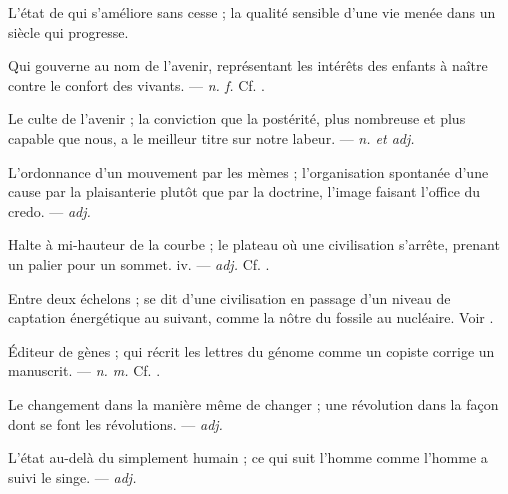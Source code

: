  L'état de qui s'améliore sans cesse ; la qualité sensible d'une vie menée dans un siècle qui progresse.

 Qui gouverne au nom de l'avenir, représentant les intérêts des enfants à naître contre le confort des vivants. ---  \textit{n. f.} Cf. .

 Le culte de l'avenir ; la conviction que la postérité, plus nombreuse et plus capable que nous, a le meilleur titre sur notre labeur. ---  \textit{n. et adj.}

 L'ordonnance d'un mouvement par les mèmes ; l'organisation spontanée d'une cause par la plaisanterie plutôt que par la doctrine, l'image faisant l'office du credo. ---  \textit{adj.}

 Halte à mi-hauteur de la courbe ; le plateau où une civilisation s'arrête, prenant un palier pour un sommet.   iv. ---  \textit{adj.} Cf. .

 Entre deux échelons ; se dit d'une civilisation en passage d'un niveau de captation énergétique au suivant, comme la nôtre du fossile au nucléaire. Voir .

 Éditeur de gènes ; qui récrit les lettres du génome comme un copiste corrige un manuscrit. ---  \textit{n. m.} Cf. .

 Le changement dans la manière même de changer ; une révolution dans la façon dont se font les révolutions. ---  \textit{adj.}

 L'état au-delà du simplement humain ; ce qui suit l'homme comme l'homme a suivi le singe. ---  \textit{adj.}

